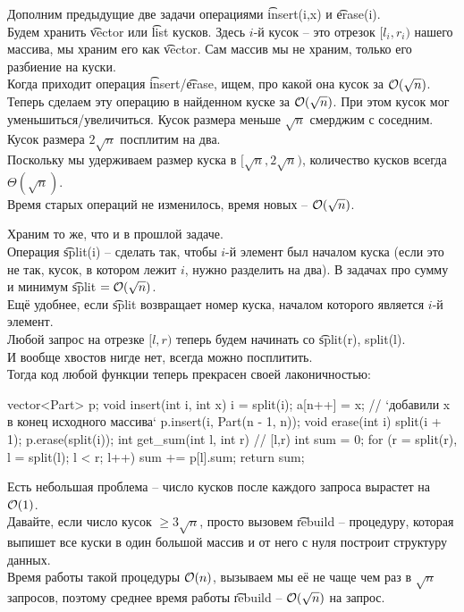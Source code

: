 Дополним предыдущие две задачи операциями \t{insert(i,x)} и \t{erase(i)}.\\
Будем хранить \t{vector} или \t{list} кусков. Здесь $i$-й кусок -- это отрезок $[l_i,r_i)$ нашего массива,
мы храним его как \t{vector}. Сам массив мы не храним, только его разбиение на куски.\\
Когда приходит операция \t{insert}/\t{erase}, ищем, про какой она кусок за $\mathcal{O}(\sqrt{n})$.
Теперь сделаем эту операцию в найденном куске за $\mathcal{O}(\sqrt{n})$.
При этом кусок мог уменьшиться/увеличиться.
Кусок размера меньше $\sqrt{n}$ смерджим с соседним. Кусок размера $2\sqrt{n}$ посплитим на два.\\
Поскольку мы удерживаем размер куска в $[\sqrt{n}, 2\sqrt{n})$, количество кусков всегда $\Theta(\sqrt{n})$.\\
Время старых операций не изменилось, время новых -- $\mathcal{O}(\sqrt{n})$.


Храним то же, что и в прошлой задаче.\\
Операция \t{split(i)} -- сделать так, чтобы $i$-й элемент был началом куска (если это не так, 
кусок, в котором лежит $i$, нужно разделить на два). В задачах про сумму и минимум \t{split} $= \mathcal{O}(\sqrt{n})$.\\
Ещё удобнее, если \t{split} возвращает номер куска, началом которого является $i$-й элемент.\\
Любой запрос на отрезке $[l,r)$ теперь будем начинать со \t{split(r), split(l)}.\\
И вообще хвостов нигде нет, всегда можно посплитить.\\
Тогда код любой функции теперь прекрасен своей лаконичностью:

\pagebreak

\vspace*{-1.5em}
\begin{code}
vector<Part> p;
void insert(int i, int x) {
	i = split(i); 
	a[n++] = x; // `добавили x в конец исходного массива`
	p.insert(i, Part(n - 1, n));
}
void erase(int i) {
	split(i + 1);
	p.erase(split(i));
}
int get_sum(int l, int r) { // [l,r)
	int sum = 0;
	for (r = split(r), l = split(l); l < r; l++)
		sum += p[l].sum;
	return sum;
}
\end{code}
Есть небольшая проблема -- число кусков после каждого запроса вырастет на $\mathcal{O}(1)$.\\
Давайте, если число кусок $\ge 3 \sqrt{n}$, просто вызовем \t{rebuild} -- процедуру, 
которая выпишет все куски в один большой массив и от него с нуля построит структуру данных.\\
Время работы такой процедуры $\mathcal{O}(n)$, вызываем мы её не чаще чем раз в $\sqrt{n}$ запросов, 
поэтому среднее время работы \t{rebuild} -- $\mathcal{O}(\sqrt{n})$ на запрос.

